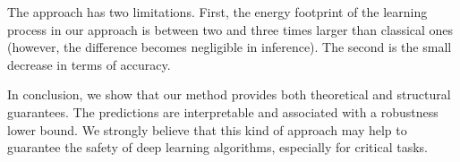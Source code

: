 \documentclass{article}
\begin{document}
The approach has two limitations. First, the energy footprint of the learning process in our approach is between two and three times larger than classical ones (however, the difference becomes negligible in inference). The second is the small decrease in terms of accuracy.

In conclusion, we show that our method provides both theoretical and structural guarantees. The predictions are interpretable and associated with a robustness lower bound. We strongly believe that this kind of approach may help to guarantee the safety of deep learning algorithms, especially for critical tasks.
\newpage
\fi

 

\end{document}
